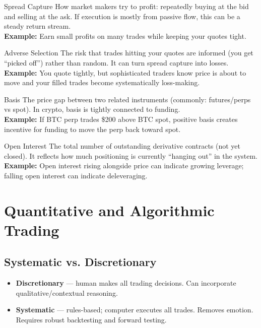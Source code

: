 \begin{keyterm}{Spread Capture}
How market makers try to profit: repeatedly buying at the bid and selling at the ask.
If execution is mostly from passive flow, this can be a steady return stream.
\\\textbf{Example:} Earn small profits on many trades while keeping your quotes tight.
\end{keyterm}

\begin{keyterm}{Adverse Selection}
The risk that trades hitting your quotes are informed (you get ``picked off'') rather than random.
It can turn spread capture into losses.
\\\textbf{Example:} You quote tightly, but sophisticated traders know price is about to move and
your filled trades become systematically loss-making.
\end{keyterm}

\begin{keyterm}{Basis}
The price gap between two related instruments (commonly: futures/perps vs spot).
In crypto, basis is tightly connected to funding.
\\\textbf{Example:} If BTC perp trades \$200 above BTC spot, positive basis creates incentive for funding
to move the perp back toward spot.
\end{keyterm}

\begin{keyterm}{Open Interest}
The total number of outstanding derivative contracts (not yet closed). It reflects how much positioning
is currently ``hanging out'' in the system.
\\\textbf{Example:} Open interest rising alongside price can indicate growing leverage; falling open interest
can indicate deleveraging.
\end{keyterm}

\section{Quantitative and Algorithmic Trading}

\subsection{Systematic vs. Discretionary}
\begin{itemize}
  \item \textbf{Discretionary} — human makes all trading decisions. Can incorporate
        qualitative/contextual reasoning.
  \item \textbf{Systematic} — rules-based; computer executes all trades. Removes emotion.
        Requires robust backtesting and forward testing.
\end{itemize}

